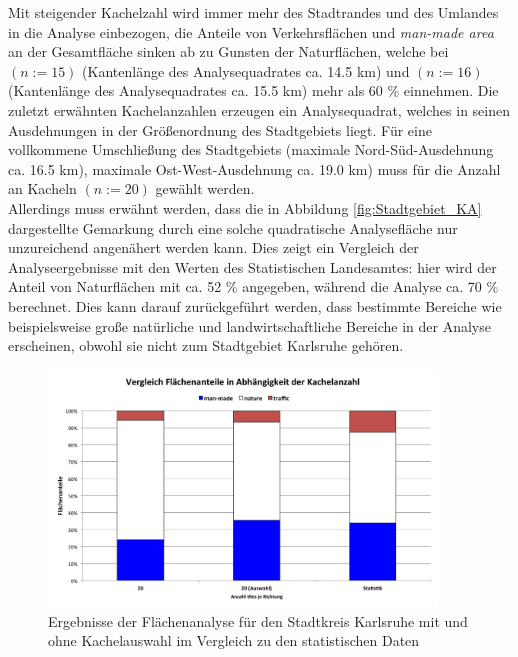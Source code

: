 \documentclass[12pt,a4paper]{scrartcl}
\begin{document}
%
Mit steigender Kachelzahl wird immer mehr des Stadtrandes und des Umlandes in die Analyse einbezogen, die Anteile von Verkehrsflächen und \textit{man-made area} an der Gesamtfläche sinken ab zu Gunsten der Naturflächen, welche bei  \((n:=15)\) (Kantenlänge des Analysequadrates ca. \num{14.5} \si{\kilo\metre}) und  \((n:=16)\) (Kantenlänge des Analysequadrates ca. \num{15.5} \si{\kilo\metre}) mehr als \num{60} \% einnehmen. Die zuletzt erwähnten Kachelanzahlen erzeugen ein Analysequadrat, welches in seinen Ausdehnungen in der Größenordnung des Stadtgebiets liegt. Für eine vollkommene Umschließung des Stadtgebiets (maximale Nord-Süd-Ausdehnung ca. \num{16.5} \si{\kilo\metre}), maximale Ost-West-Ausdehnung ca. \num{19.0} \si{\kilo\metre}) muss für die Anzahl an Kacheln \((n:=20)\) gewählt werden. \\
\newline
Allerdings muss erwähnt werden, dass die in Abbildung \ref{fig:Stadtgebiet_KA} dargestellte Gemarkung durch eine solche quadratische Analysefläche nur unzureichend angenähert werden kann. Dies zeigt ein Vergleich der Analyseergebnisse mit den Werten des Statistischen Landesamtes: hier wird der Anteil von Naturflächen mit ca. \num{52} \% angegeben, während die Analyse ca. \num{70} \% berechnet. Dies kann darauf zurückgeführt werden, dass bestimmte Bereiche wie beispielsweise große natürliche und landwirtschaftliche Bereiche in der Analyse erscheinen, obwohl sie nicht zum Stadtgebiet Karlsruhe gehören.\\
%
\newline
\begin{figure}
  \centering
    \includegraphics[width=0.92\textwidth]{images/3_Kachelvergleich_KA_skip.png}
    \caption{Ergebnisse der Flächenanalyse für den Stadtkreis Karlsruhe mit und ohne Kachelauswahl im Vergleich zu den statistischen Daten}
    \label{fig:Kachel_skip_vgl}
\end{figure}
\end{document}
